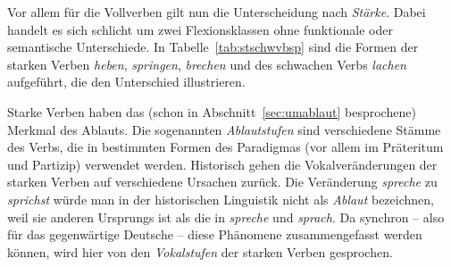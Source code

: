 Vor allem für die Vollverben gilt nun die Unterscheidung nach \textit{Stärke}.
Dabei handelt es sich schlicht um zwei Flexionsklassen ohne funktionale oder semantische Unterschiede.
In Tabelle~\ref{tab:stschwvbsp} sind die Formen der starken Verben \textit{heben}, \textit{springen}, \textit{brechen} und des schwachen Verbs \textit{lachen} aufgeführt, die den Unterschied illustrieren.

\begin{table}
  \caption{Beispielformen starker und schwacher Verben}
  \label{tab:stschwvbsp}
\end{table}

Starke Verben haben das (schon in Abschnitt~\ref{sec:umablaut} besprochene) Merkmal des Ablauts.
Die sogenannten \textit{Ablautstufen} sind verschiedene Stämme des Verbs, die in bestimmten Formen des Paradigmas (vor allem im Präteritum und Partizip) verwendet werden.
Historisch gehen die Vokalveränderungen der starken Verben auf verschiedene Ursachen zurück.
Die Veränderung \textit{spreche} zu \textit{sprichst} würde man \zB in der historischen Linguistik nicht als \textit{Ablaut} bezeichnen, weil sie anderen Ursprungs ist als die in \textit{spreche} und \textit{sprach}.
Da synchron -- also für das gegenwärtige Deutsche -- diese Phänomene zusammengefasst werden können, wird hier von den \textit{Vokalstufen} der starken Verben gesprochen.

